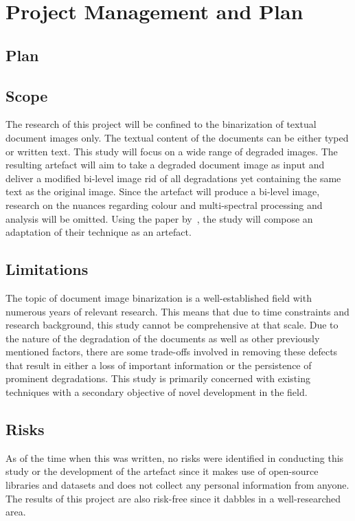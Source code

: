 \documentclass[a4paper, 12pt]{report}
\begin{document}
\section{Project Management and Plan}
\subsection{Plan}
\subsection{Scope}
The research of this project will be confined to the binarization of textual document images only. The textual content of the documents can be either typed or written text. This study will focus on a wide range of degraded images. The resulting artefact will aim to take a degraded document image as input and deliver a modified bi-level image rid of all degradations yet containing the same text as the original image. Since the artefact will produce a bi-level image, research on the nuances regarding colour and multi-spectral processing and analysis will be omitted. Using the paper by~\cite{su2012robust}, the study will compose an adaptation of their technique as an artefact.

\subsection{Limitations}
The topic of document image binarization is a well-established field with numerous years of relevant research. This means that due to time constraints and research background, this study cannot be comprehensive at that scale.
Due to the nature of the degradation of the documents as well as other previously mentioned factors, there are some trade-offs involved in removing these defects that result in either a loss of important information or the persistence of prominent degradations. This study is primarily concerned with existing techniques with a secondary objective of novel development in the field.

\subsection{Risks}
As of the time when this was written, no risks were identified in conducting this study or the development of the artefact since it makes use of open-source libraries and datasets and does not collect any personal information from anyone. The results of this project are also risk-free since it dabbles in a well-researched area.
\end{document}
